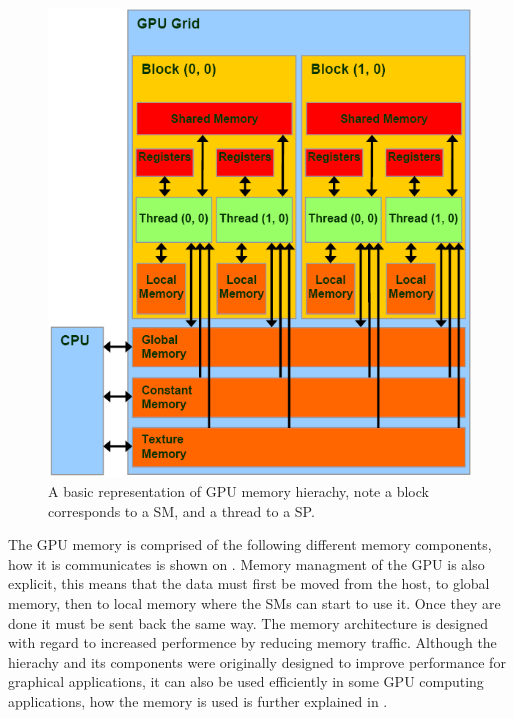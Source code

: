 \begin{figure}[h!]
\centering
 \includegraphics[width=1\textwidth]{figures/GPUMemory.PNG} %
\caption{A basic representation of GPU memory hierachy, note a block corresponds to a SM, and a thread to a SP.}\label{image:GPUMemory} 
\end{figure}
The GPU memory is comprised of the following different memory components, how it is communicates is shown on . 
Memory managment of the GPU is also explicit, this means that the data must first be moved from the host, to global memory, then to local memory where the SMs can start to use it. 
Once they are done it must be sent back the same way.
The memory architecture is designed with regard to increased performence by reducing memory traffic.
Although the hierachy and its components were originally designed to improve performance for graphical applications, it can also be used efficiently in some GPU computing applications, how the memory is used is further explained in . %

